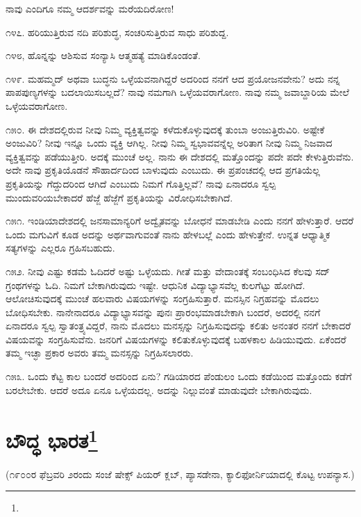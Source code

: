 ನಾವು ಎಂದಿಗೂ ನಮ್ಮ ಆದರ್ಶವನ್ನು ಮರೆಯದಿರೋಣ!

೧೪೭. ಹರಿಯುತ್ತಿರುವ ನದಿ ಪರಿಶುದ್ಧ, ಸಂಚರಿಸುತ್ತಿರುವ ಸಾಧು ಪರಿಶುದ್ದ.

೧೪೮, ಹೊನ್ನನ್ನು ಆಶಿಸುವ ಸಂನ್ಯಾಸಿ ಆತ್ಮಹತ್ಯೆ ಮಾಡಿಕೊಂಡಂತೆ.

೧೪೯. ಮಹಮ್ಮದ್ ಅಥವಾ ಬುದ್ಧನು ಒಳ್ಳೆಯವನಾಗಿದ್ದರೆ ಅದರಿಂದ ನನಗೆ ಆದ ಪ್ರಯೋಜನವೇನು? ಅದು ನನ್ನ ಪಾಪಪುಣ್ಯಗಳನ್ನು ಬದಲಾಯಿಸಬಲ್ಲದೆ? ನಾವು ನಮಗಾಗಿ ಒಳ್ಳೆಯವರಾಗೋಣ. ನಾವು ನಮ್ಮ ಜವಾಬ್ದಾರಿಯ ಮೇಲೆ ಒಳ್ಳೆಯವರಾಗೋಣ.

೧೫೦. ಈ ದೇಶದಲ್ಲಿರುವ ನೀವು ನಿಮ್ಮ ವ್ಯಕ್ತಿತ್ವವನ್ನು ಕಳೆದುಕೊಳ್ಳುವುದಕ್ಕೆ ತುಂಬಾ ಅಂಜುತ್ತಿರುವಿರಿ. ಅಷ್ಟೇಕೆ ಅಂಜುವಿರಿ? ನೀವು ಇನ್ನೂ ಒಂದು ವ್ಯಕ್ತಿ ಆಗಿಲ್ಲ. ನೀವು ನಿಮ್ಮ ಸ್ವಭಾವವನ್ನೆಲ್ಲ ಅರಿತಾಗ ನೀವು ನಿಮ್ಮ ನಿಜವಾದ ವ್ಯಕ್ತಿತ್ವವನ್ನು ಪಡೆಯುತ್ತೀರಿ. ಅದಕ್ಕೆ ಮುಂಚೆ ಅಲ್ಲ. ನಾನು ಈ ದೇಶದಲ್ಲಿ ಮತ್ತೊಂದನ್ನು ಪದೇ ಪದೇ ಕೇಳುತ್ತಿರುವೆನು. ಅದೇ ನಾವು ಪ್ರಕೃತಿಯೊಡನೆ ಸೌಹಾರ್ದದಿಂದ ಬಾಳುವುದು ಎಂಬುದು. ಈ ಪ್ರಪಂಚದಲ್ಲಿ ಆದ ಪ್ರಗತಿಯೆಲ್ಲ ಪ್ರಕೃತಿಯನ್ನು ಗೆದ್ದುದರಿಂದ ಆಗಿದೆ ಎಂಬುದು ನಿಮಗೆ ಗೊತ್ತಿಲ್ಲವೆ? ನಾವು ಏನಾದರೂ ಸ್ವಲ್ಪ ಮುಂದುವರಿಯಬೇಕಾದರೆ ಹೆಜ್ಜೆ ಹೆಜ್ಜೆಗೆ ಪ್ರಕೃತಿಯನ್ನು ವಿರೋಧಿಸಬೇಕಾಗಿದೆ.

೧೫೧. ಇಂಡಿಯಾದೇಶದಲ್ಲಿ ಜನಸಾಮಾನ್ಯರಿಗೆ ಅದ್ವೈತವನ್ನು ಬೋಧನೆ ಮಾಡಬೇಡಿ ಎಂದು ನನಗೆ ಹೇಳುತ್ತಾರೆ. ಆದರೆ ಒಂದು ಮಗುವಿಗೆ ಕೂಡ ಅದನ್ನು ಅರ್ಥವಾಗುವಂತೆ ನಾನು ಹೇಳಬಲ್ಲೆ ಎಂದು ಹೇಳುತ್ತೇನೆ. ಉನ್ನತ ಆಧ್ಯಾತ್ಮಿಕ ಸತ್ಯಗಳನ್ನು ಎಲ್ಲರೂ ಗ್ರಹಿಸಬಹುದು.

೧೫೨. ನೀವು ಎಷ್ಟು ಕಡಮೆ ಓದಿದರೆ ಅಷ್ಟು ಒಳ್ಳೆಯದು. ಗೀತೆ ಮತ್ತು ವೇದಾಂತಕ್ಕೆ ಸಂಬಂಧಿಸಿದ ಕೆಲವು ಸದ್ ಗ್ರಂಥಗಳನ್ನು ಓದಿ. ನಿಮಗೆ ಬೇಕಾಗಿರುವುದು ಇಷ್ಟೇ. ಆಧುನಿಕ ವಿದ್ಯಾಭ್ಯಾಸವೆಲ್ಲ ಕುಲಗೆಟ್ಟು ಹೋಗಿದೆ. ಆಲೋಚಿಸುವುದಕ್ಕೆ ಮುಂಚೆ ಹಲವಾರು ವಿಷಯಗಳನ್ನು ಸಂಗ್ರಹಿಸುತ್ತಾರೆ. ಮನಸ್ಸಿನ ನಿಗ್ರಹವನ್ನು ಮೊದಲು ಬೋಧಿಸಬೇಕು. ನಾನೇನಾದರೂ ವಿದ್ಯಾಭ್ಯಾಸವನ್ನು ಪುನಃ ಪ್ರಾರಂಭಮಾಡಬೇಕಾಗಿ ಬಂದರೆ, ಅದರಲ್ಲಿ ನನಗೆ ಏನಾದರೂ ಸ್ವಲ್ಪ ಸ್ವಾತಂತ್ರ್ಯವಿದ್ದರೆ, ನಾನು ಮೊದಲು ಮನಸ್ಸನ್ನು ನಿಗ್ರಹಿಸುವುದನ್ನು ಕಲಿತು ಅನಂತರ ನನಗೆ ಬೇಕಾದರೆ ವಿಷಯವನ್ನು ಸಂಗ್ರಹಿಸುವೆನು. ಜನರಿಗೆ ವಿಷಯಗಳನ್ನು ಕಲಿತುಕೊಳ್ಳುವುದಕ್ಕೆ ಬಹಳಕಾಲ ಹಿಡಿಯುವುದು. ಏಕೆಂದರೆ ತಮ್ಮ ಇಚ್ಛಾ ಪ್ರಕಾರ ಅವರು ತಮ್ಮ ಮನಸ್ಸನ್ನು ನಿಗ್ರಹಿಸಲಾರರು.

೧೫೩. ಒಂದು ಕೆಟ್ಟ ಕಾಲ ಬಂದರೆ ಅದರಿಂದ ಏನು? ಗಡಿಯಾರದ ಪೆಂಡುಲಂ ಒಂದು ಕಡೆಯಿಂದ ಮತ್ತೊಂದು ಕಡೆಗೆ ಬರಲೇಬೇಕು. ಆದರೆ ಅದೂ ಏನೂ ಒಳ್ಳೆಯದಲ್ಲ. ಅದನ್ನು ನಿಲ್ಲುವಂತೆ ಮಾಡುವುದೇ ಬೇಕಾಗಿರುವುದು.

\newpage

\chapter[ಬೌದ್ಧ ಭಾರತ]{ಬೌದ್ಧ ಭಾರತ\protect\footnote{}}

\begin{center}
(೧೯೦೦ರ ಫೆಬ್ರವರಿ ೨ರಂದು ಸಂಜೆ ಷೇಕ್ಸ್ ಪಿಯರ್ ಕ್ಲಬ್, ಪ್ಯಾಸಡೇನಾ, ಕ್ಯಾಲಿಫೋರ್ನಿಯಾದಲ್ಲಿ ಕೊಟ್ಟ ಉಪನ್ಯಾಸ.)
\end{center}


